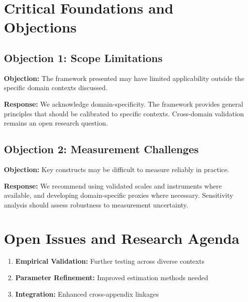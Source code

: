 \section{Critical Foundations and Objections}
\label{sec:gtc-foundations}

\subsection{Objection 1: Scope Limitations}

\textbf{Objection:} The framework presented may have limited applicability
outside the specific domain contexts discussed.

\textbf{Response:} We acknowledge domain-specificity. The framework provides
general principles that should be calibrated to specific contexts. Cross-domain
validation remains an open research question.

\subsection{Objection 2: Measurement Challenges}

\textbf{Objection:} Key constructs may be difficult to measure reliably in
practice.

\textbf{Response:} We recommend using validated scales and instruments where
available, and developing domain-specific proxies where necessary. Sensitivity
analysis should assess robustness to measurement uncertainty.



\section{Open Issues and Research Agenda}
\label{sec:gtc-open}

\begin{enumerate}
    \item \textbf{Empirical Validation:} Further testing across diverse contexts
    \item \textbf{Parameter Refinement:} Improved estimation methods needed
    \item \textbf{Integration:} Enhanced cross-appendix linkages
\end{enumerate}

